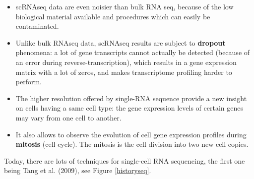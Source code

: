 \documentclass{report}
\begin{document}
\begin{itemize}
\item scRNAseq data are even noisier than bulk RNA seq, because of the low biological material available and procedures which can easily be contaminated\cite{brennecke2013accounting}\cite{grun2014validation}.
\item Unlike bulk RNAseq data, scRNAseq results are subject to \textbf{dropout} phenomena\cite{kharchenko2014bayesian}\cite{lun2016pooling}: a lot of gene transcripts cannot actually be detected (because of an error during reverse-transcription), which results in a gene expression matrix with a lot of zeros, and makes transcriptome profiling harder to perform.
\item The higher resolution offered by single-RNA sequence provide a new insight on cells having a same cell type: the gene expression levels of certain genes may vary from one cell to another\cite{poirion2016single}\cite{martinez2017aging}.
\item It also allows to observe the evolution of cell gene expression profiles during \textbf{mitosis} (cell cycle)\cite{trapnell2014dynamics}. The mitosis is the cell division into two new cell copies.

\end{itemize} 

Today, there are lots of techniques\cite{shapiro2013single} for single-cell RNA sequencing, the first one being Tang et al.\cite{tang2009mrna} (2009), see Figure \ref{historyseq}.
\end{document}
